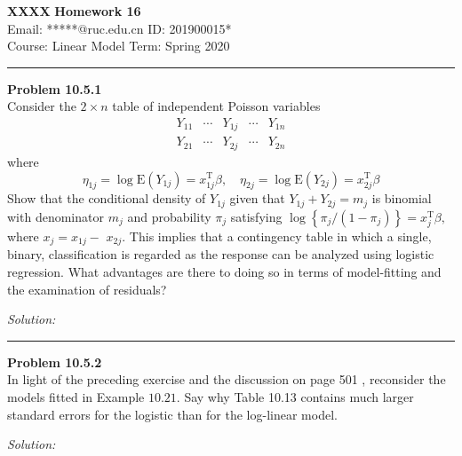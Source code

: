 \documentclass[a4paper, 11pt]{article}
\newenvironment{problem}[2][Problem]
    { \begin{mdframed}[backgroundcolor=gray!20] \textbf{#1 #2} \\}
    {  \end{mdframed}}
\newenvironment{solution}
    {\textit{Solution:}}
    {}
\begin{document}
\noindent
\large\textbf{XXXX} \hfill \textbf{Homework 16}   \\
Email: *****@ruc.edu.cn \hfill ID: 201900015* \\
\normalsize Course: Linear Model   \hfill Term: Spring 2020\\
\noindent\rule{7in}{2.8pt}


\begin{problem}{10.5.1}
  Consider the $2 \times n$ table of independent Poisson variables
  $$
  \begin{array}{lllll}
  Y_{11} & \cdots & Y_{1 j} & \cdots & Y_{1 n} \\
  Y_{21} & \cdots & Y_{2 j} & \cdots & Y_{2 n}
  \end{array}
  $$
  where
  $$
  \eta_{1 j}=\log \mathrm{E}\left(Y_{1 j}\right)=x_{1 j}^{\mathrm{T}} \beta, \quad \eta_{2 j}=\log \mathrm{E}\left(Y_{2 j}\right)=x_{2 j}^{\mathrm{T}} \beta
  $$
  Show that the conditional density of $Y_{1 j}$ given that $Y_{1 j}+Y_{2 j}=m_{j}$ is binomial with denominator $m_{j}$ and probability $\pi_{j}$ satisfying $\log \left\{\pi_{j} /\left(1-\pi_{j}\right)\right\}=x_{j}^{\mathrm{T}} \beta,$ where $x_{j}=x_{1 j}-$ $x_{2 j} .$
  This implies that a contingency table in which a single, binary, classification is regarded as the response can be analyzed using logistic regression. What advantages are there to doing so in terms of model-fitting and the examination of residuals?
\end{problem}
\begin{solution}


\end{solution}

\noindent\rule{7in}{2.8pt}

\begin{problem}{10.5.2}
In light of the preceding exercise and the discussion on page 501 , reconsider the models fitted in Example $10.21 .$ Say why Table 10.13 contains much larger standard errors for the logistic than for the log-linear model.
\end{problem}
\begin{solution}


\end{solution}
\end{document}
